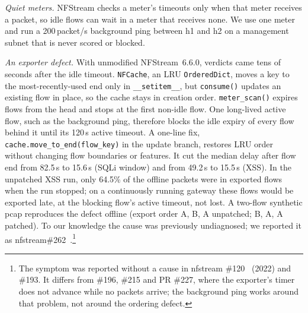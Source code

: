 \emph{Quiet meters.} NFStream checks a meter's timeouts only when that meter receives a packet, so idle flows can wait in a meter that receives none. We use one meter and run a 200\,packet/s background ping between h1 and h2 on a management subnet that is never scored or blocked.

\emph{An exporter defect.} With unmodified NFStream~6.6.0, verdicts came tens of seconds after the idle timeout. \texttt{NFCache}, an LRU \texttt{OrderedDict}, moves a key to the most-recently-used end only in \texttt{\_\_setitem\_\_}, but \texttt{consume()} updates an existing flow in place, so the cache stays in creation order. \texttt{meter\_scan()} expires flows from the head and stops at the first non-idle flow. One long-lived active flow, such as the background ping, therefore blocks the idle expiry of every flow behind it until its 120\,s active timeout. A one-line fix, \texttt{cache.move\_to\_end(flow\_key)} in the update branch, restores LRU order without changing flow boundaries or features. It cut the median delay after flow end from 82.5\,s to 15.6\,s (SQLi window) and from 49.2\,s to 15.5\,s (XSS). In the unpatched XSS run, only 64.5\% of the offline packets were in exported flows when the run stopped; on a continuously running gateway these flows would be exported late, at the blocking flow's active timeout, not lost. A two-flow synthetic pcap reproduces the defect offline (export order A, B, A unpatched; B, A, A patched). To our knowledge the cause was previously undiagnosed; we reported it as nfstream\#262~\cite{nfstream262}.\footnote{The symptom was reported without a cause in nfstream \#120~\cite{nfstream120} (2022) and \#193. It differs from \#196, \#215 and PR \#227, where the exporter's timer does not advance while no packets arrive; the background ping works around that problem, not around the ordering defect.}

